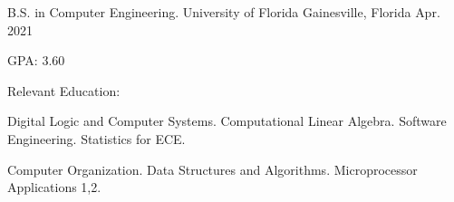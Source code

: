 


\begin{cventries}


\cventry
{B.S. in Computer Engineering.} %
{University of Florida} %
{Gainesville, Florida} %
{Apr. 2021} %
{ %
\begin{cvitems}
\item {GPA: 3.60}
\item Relevant Education:
\setlength{\itemindent}{.125in}
\item {Digital Logic and Computer Systems. Computational Linear Algebra. Software Engineering. Statistics for ECE.}
\item {Computer Organization. Data Structures and Algorithms. Microprocessor Applications 1,2.}
\end{cvitems}
}


\end{cventries}
